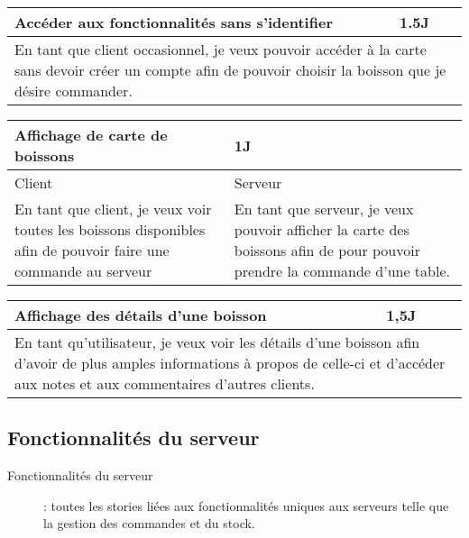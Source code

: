 \begin{center}
	\begin{tabular}{ll}
		\hline
			\multicolumn{1}{|p{14cm}|}{Accéder aux fonctionnalités sans s’identifier} & \multicolumn{1}{p{0.7cm}|}{1.5J} \\ 
		\hline
			\multicolumn{2}{|p{15cm}|}{En tant que client occasionnel, je veux pouvoir
			accéder à la carte sans devoir créer un compte afin de pouvoir choisir
			la boisson que je désire commander.} \\
		\hline
	\end{tabular}

	\vspace{1cm}
	
	\begin{tabular}{lll}
		\hline
			\multicolumn{2}{|p{14cm}}{Affichage de carte de boissons } & \multicolumn{1}{|p{0.7cm}|}{1J} \\
		\hline
			\multicolumn{1}{|p{7cm}}{Client} & \multicolumn{2}{|p{7cm}|}{Serveur} \\ 
		\hline
			\multicolumn{1}{|p{7cm}}{En tant que client, je veux voir toutes les boissons disponibles 
			afin de pouvoir faire une commande au serveur } & \multicolumn{2}{|p{7cm}|}{En tant que 
			serveur, je veux pouvoir afficher la carte des boissons afin de pour pouvoir prendre la commande d'une table.} \\ 
		\hline
	\end{tabular}

	\vspace{1cm}
	
	\begin{tabular}{ll}
		\hline
			\multicolumn{1}{|p{14cm}|}{Affichage des détails d'une boisson} & \multicolumn{1}{p{0.7cm}|}{1,5J}\\ 
		\hline
			\multicolumn{2}{|p{15cm}|}{En tant qu'utilisateur, je veux voir les détails d'une 
			boisson afin d'avoir de plus amples informations à propos de celle-ci et d'accéder 
			aux notes et aux commentaires d'autres clients.}\\
		\hline
	\end{tabular}
\end{center}

\subsection{Fonctionnalités du serveur}
\begin{description}
	\item[Fonctionnalités du serveur] : toutes les stories liées aux fonctionnalités
	uniques aux serveurs telle que la gestion des commandes et du stock.
\end{description}

